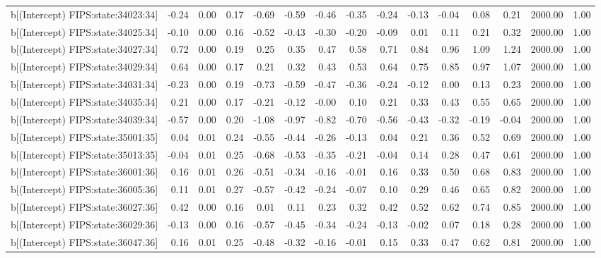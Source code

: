 \begin{table}[ht]
\begin{tabular}{rrrrrrrrrrrrrrr}
  b[(Intercept) FIPS:state:34023:34] & -0.24 & 0.00 & 0.17 & -0.69 & -0.59 & -0.46 & -0.35 & -0.24 & -0.13 & -0.04 & 0.08 & 0.21 & 2000.00 & 1.00 \\ 
  b[(Intercept) FIPS:state:34025:34] & -0.10 & 0.00 & 0.16 & -0.52 & -0.43 & -0.30 & -0.20 & -0.09 & 0.01 & 0.11 & 0.21 & 0.32 & 2000.00 & 1.00 \\ 
  b[(Intercept) FIPS:state:34027:34] & 0.72 & 0.00 & 0.19 & 0.25 & 0.35 & 0.47 & 0.58 & 0.71 & 0.84 & 0.96 & 1.09 & 1.24 & 2000.00 & 1.00 \\ 
  b[(Intercept) FIPS:state:34029:34] & 0.64 & 0.00 & 0.17 & 0.21 & 0.32 & 0.43 & 0.53 & 0.64 & 0.75 & 0.85 & 0.97 & 1.07 & 2000.00 & 1.00 \\ 
  b[(Intercept) FIPS:state:34031:34] & -0.23 & 0.00 & 0.19 & -0.73 & -0.59 & -0.47 & -0.36 & -0.24 & -0.12 & 0.00 & 0.13 & 0.23 & 2000.00 & 1.00 \\ 
  b[(Intercept) FIPS:state:34035:34] & 0.21 & 0.00 & 0.17 & -0.21 & -0.12 & -0.00 & 0.10 & 0.21 & 0.33 & 0.43 & 0.55 & 0.65 & 2000.00 & 1.00 \\ 
  b[(Intercept) FIPS:state:34039:34] & -0.57 & 0.00 & 0.20 & -1.08 & -0.97 & -0.82 & -0.70 & -0.56 & -0.43 & -0.32 & -0.19 & -0.04 & 2000.00 & 1.00 \\ 
  b[(Intercept) FIPS:state:35001:35] & 0.04 & 0.01 & 0.24 & -0.55 & -0.44 & -0.26 & -0.13 & 0.04 & 0.21 & 0.36 & 0.52 & 0.69 & 2000.00 & 1.00 \\ 
  b[(Intercept) FIPS:state:35013:35] & -0.04 & 0.01 & 0.25 & -0.68 & -0.53 & -0.35 & -0.21 & -0.04 & 0.14 & 0.28 & 0.47 & 0.61 & 2000.00 & 1.00 \\ 
  b[(Intercept) FIPS:state:36001:36] & 0.16 & 0.01 & 0.26 & -0.51 & -0.34 & -0.16 & -0.01 & 0.16 & 0.33 & 0.50 & 0.68 & 0.83 & 2000.00 & 1.00 \\ 
  b[(Intercept) FIPS:state:36005:36] & 0.11 & 0.01 & 0.27 & -0.57 & -0.42 & -0.24 & -0.07 & 0.10 & 0.29 & 0.46 & 0.65 & 0.82 & 2000.00 & 1.00 \\ 
  b[(Intercept) FIPS:state:36027:36] & 0.42 & 0.00 & 0.16 & 0.01 & 0.11 & 0.23 & 0.32 & 0.42 & 0.52 & 0.62 & 0.74 & 0.85 & 2000.00 & 1.00 \\ 
  b[(Intercept) FIPS:state:36029:36] & -0.13 & 0.00 & 0.16 & -0.57 & -0.45 & -0.34 & -0.24 & -0.13 & -0.02 & 0.07 & 0.18 & 0.28 & 2000.00 & 1.00 \\ 
  b[(Intercept) FIPS:state:36047:36] & 0.16 & 0.01 & 0.25 & -0.48 & -0.32 & -0.16 & -0.01 & 0.15 & 0.33 & 0.47 & 0.62 & 0.81 & 2000.00 & 1.00 \\ 

\end{tabular}
\end{table}
